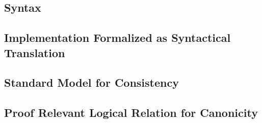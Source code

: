 





\subsection{Syntax}





\subsection{Implementation Formalized as Syntactical Translation}



\subsection{Standard Model for Consistency}




\subsection{Proof Relevant Logical Relation for Canonicity}

